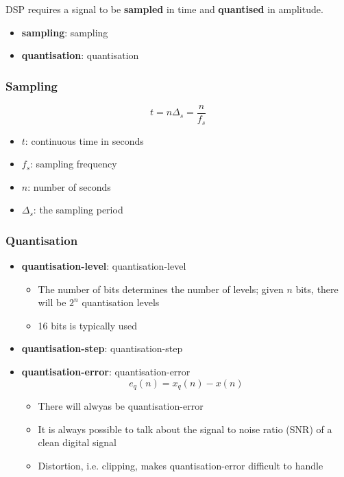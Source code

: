     DSP requires a signal to be \textbf{sampled} in time and \textbf{quantised}
    in amplitude.

    \begin{itemize}
      \item \textbf{\Gls{sampling}}: \glsdesc{sampling}
      \item \textbf{\Gls{quantisation}}: \glsdesc{quantisation}
    \end{itemize}

    \subsubsection{Sampling}

      \begin{equation}
        t = n \Delta_{s} = \frac{n}{f_{s}}
      \end{equation}

      \begin{itemize}
        \item $ t $: continuous time in seconds
        \item $ f_{s} $: sampling frequency
        \item $ n $: number of seconds
        \item $ \Delta_{s} $: the sampling period
      \end{itemize}

    \subsubsection{Quantisation}

      \begin{itemize}
        \item \textbf{\Gls{quantisation-level}}: \glsdesc{quantisation-level}
        \begin{itemize}
          \item The number of bits determines the number of levels; given $ n $
          bits, there will be $ 2^{n} $ quantisation levels
          \item 16 bits is typically used
        \end{itemize}

        \item \textbf{\Gls{quantisation-step}}: \glsdesc{quantisation-step}
        \item \textbf{\Gls{quantisation-error}}: \glsdesc{quantisation-error}
        \begin{equation}
          e_{q}\left( n \right) = x_{q}\left( n \right) - x\left( n \right)
        \end{equation}
        \begin{itemize}
          \item There will alwyas be \gls{quantisation-error}
          \item It is always possible to talk about the signal to noise ratio
          (SNR) of a clean digital signal
          \item Distortion, i.e. clipping, makes \gls{quantisation-error}
          difficult to handle
        \end{itemize}
      \end{itemize}

